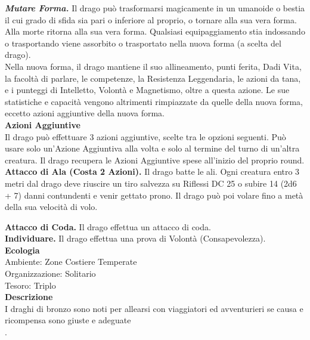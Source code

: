 \begin{multicols}{2}
\emph{\textbf{Mutare Forma.}} Il drago può trasformarsi magicamente in un umanoide o bestia il cui grado di sfida sia pari o inferiore al proprio, o tornare alla sua vera forma. Alla morte ritorna alla sua vera forma. Qualsiasi equipaggiamento stia indossando o trasportando viene assorbito o trasportato nella nuova forma (a scelta del drago). \\
Nella nuova forma, il drago mantiene il suo allineamento, punti ferita, Dadi Vita, la facoltà di parlare, le competenze, la Resistenza Leggendaria, le azioni da tana, e i punteggi di Intelletto, Volontà e Magnetismo, oltre a questa azione. Le sue statistiche e capacità vengono altrimenti rimpiazzate da quelle della nuova forma, eccetto azioni aggiuntive della nuova forma.\\
\textbf{Azioni Aggiuntive}\\
Il drago può effettuare 3 azioni aggiuntive, scelte tra le opzioni seguenti. Può usare solo un'Azione Aggiuntiva alla volta e solo al termine del turno di un'altra creatura. Il drago recupera le Azioni Aggiuntive spese all'inizio del proprio round.\\

\textbf{Attacco di Ala (Costa 2 Azioni).} Il drago batte le ali. Ogni creatura entro 3 metri dal drago deve riuscire un tiro salvezza su Riflessi DC  25 o subire 14 (2d6 + 7) danni contundenti e venir gettato prono. Il drago può poi volare fino a metà della sua velocità di volo.

\textbf{Attacco di Coda.} Il drago effettua un attacco di coda.\\
\textbf{Individuare.} Il drago effettua una prova di Volontà (Consapevolezza).\\
\textbf{Ecologia}\\
Ambiente: Zone Costiere Temperate\\
Organizzazione: Solitario\\
Tesoro: Triplo\\
\textbf{Descrizione}\\
I draghi di bronzo sono noti per allearsi con viaggiatori ed avventurieri se causa e ricompensa sono giuste e adeguate\\
.


\end{multicols}
